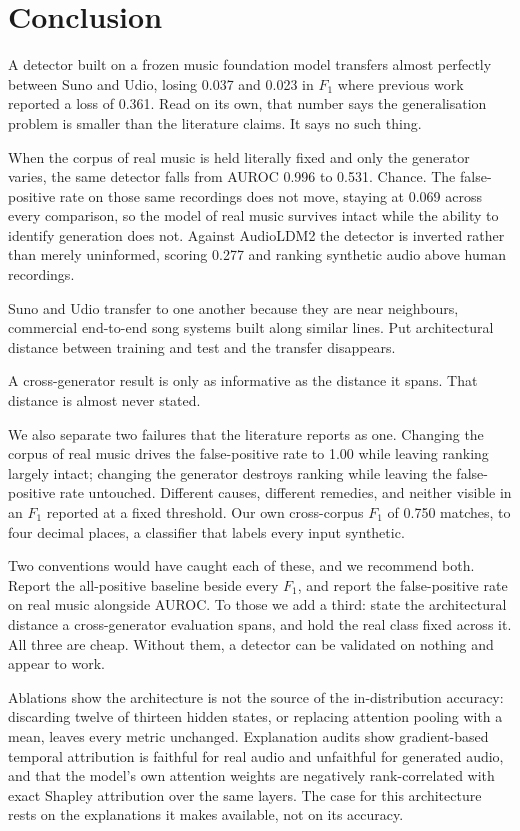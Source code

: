 \section{Conclusion}
\label{sec:conclusion}

A detector built on a frozen music foundation model transfers almost perfectly
between Suno and Udio, losing 0.037 and 0.023 in $F_1$ where previous work
reported a loss of 0.361. Read on its own, that number says the generalisation
problem is smaller than the literature claims. It says no such thing.

When the corpus of real music is held literally fixed and only the generator
varies, the same detector falls from AUROC 0.996 to 0.531. Chance. The
false-positive rate on those same recordings does not move, staying at 0.069
across every comparison, so the model of real music survives intact while the
ability to identify generation does not. Against AudioLDM2 the detector is
inverted rather than merely uninformed, scoring 0.277 and ranking synthetic
audio above human recordings.

Suno and Udio transfer to one another because they are near neighbours,
commercial end-to-end song systems built along similar lines. Put architectural
distance between training and test and the transfer disappears.

A cross-generator result is only as informative as the distance it spans. That
distance is almost never stated.

We also separate two failures that the literature reports as one. Changing the
corpus of real music drives the false-positive rate to 1.00 while leaving
ranking largely intact; changing the generator destroys ranking while leaving
the false-positive rate untouched. Different causes, different remedies, and
neither visible in an $F_1$ reported at a fixed threshold. Our own cross-corpus
$F_1$ of 0.750 matches, to four decimal places, a classifier that labels every
input synthetic.

Two conventions would have caught each of these, and we recommend both. Report
the all-positive baseline beside every $F_1$, and report the false-positive rate
on real music alongside AUROC. To those we add a third: state the architectural
distance a cross-generator evaluation spans, and hold the real class fixed
across it. All three are cheap. Without them, a detector can be validated on
nothing and appear to work.

Ablations show the architecture is not the source of the in-distribution
accuracy: discarding twelve of thirteen hidden states, or replacing attention
pooling with a mean, leaves every metric unchanged. Explanation audits show
gradient-based temporal attribution is faithful for real audio and unfaithful
for generated audio, and that the model's own attention weights are negatively
rank-correlated with exact Shapley attribution over the same layers. The case
for this architecture rests on the explanations it makes available, not on its
accuracy.
